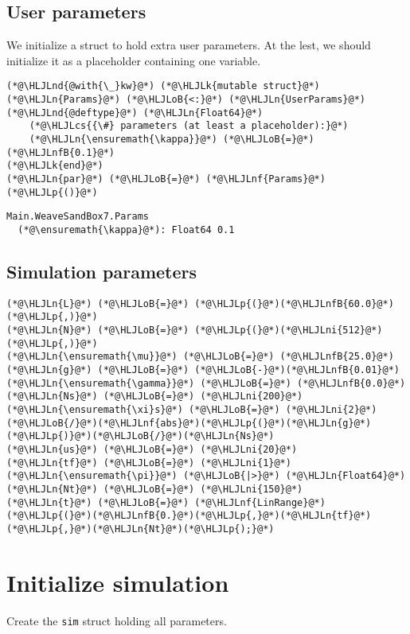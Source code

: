 \documentclass[12pt,a4paper]{article}
\newcommand{\HLJLk}[1]{\textcolor[RGB]{148,91,176}{\textbf{#1}}}
\newcommand{\HLJLn}[1]{#1}
\newcommand{\HLJLnd}[1]{\textcolor[RGB]{214,102,97}{#1}}
\newcommand{\HLJLnf}[1]{\textcolor[RGB]{66,102,213}{#1}}
\newcommand{\HLJLnfB}[1]{\textcolor[RGB]{59,151,46}{#1}}
\newcommand{\HLJLni}[1]{\textcolor[RGB]{59,151,46}{#1}}
\newcommand{\HLJLoB}[1]{\textcolor[RGB]{102,102,102}{\textbf{#1}}}
\newcommand{\HLJLp}[1]{#1}
\newcommand{\HLJLcs}[1]{\textcolor[RGB]{153,153,119}{\textit{#1}}}
\begin{document}
\subsection{User parameters}
We initialize a struct to hold extra user parameters. At the lest, we should initialize it as a placeholder containing one variable.


\begin{lstlisting}
(*@\HLJLnd{@with{\_}kw}@*) (*@\HLJLk{mutable struct}@*) (*@\HLJLn{Params}@*) (*@\HLJLoB{<:}@*) (*@\HLJLn{UserParams}@*) (*@\HLJLnd{@deftype}@*) (*@\HLJLn{Float64}@*)
    (*@\HLJLcs{{\#} parameters (at least a placeholder):}@*)
    (*@\HLJLn{\ensuremath{\kappa}}@*) (*@\HLJLoB{=}@*) (*@\HLJLnfB{0.1}@*)
(*@\HLJLk{end}@*)
(*@\HLJLn{par}@*) (*@\HLJLoB{=}@*) (*@\HLJLnf{Params}@*)(*@\HLJLp{()}@*)
\end{lstlisting}

\begin{lstlisting}
Main.WeaveSandBox7.Params
  (*@\ensuremath{\kappa}@*): Float64 0.1
\end{lstlisting}


\subsection{Simulation parameters}

\begin{lstlisting}
(*@\HLJLn{L}@*) (*@\HLJLoB{=}@*) (*@\HLJLp{(}@*)(*@\HLJLnfB{60.0}@*)(*@\HLJLp{,)}@*)
(*@\HLJLn{N}@*) (*@\HLJLoB{=}@*) (*@\HLJLp{(}@*)(*@\HLJLni{512}@*)(*@\HLJLp{,)}@*)
(*@\HLJLn{\ensuremath{\mu}}@*) (*@\HLJLoB{=}@*) (*@\HLJLnfB{25.0}@*)
(*@\HLJLn{g}@*) (*@\HLJLoB{=}@*) (*@\HLJLoB{-}@*)(*@\HLJLnfB{0.01}@*)
(*@\HLJLn{\ensuremath{\gamma}}@*) (*@\HLJLoB{=}@*) (*@\HLJLnfB{0.0}@*)
(*@\HLJLn{Ns}@*) (*@\HLJLoB{=}@*) (*@\HLJLni{200}@*)
(*@\HLJLn{\ensuremath{\xi}s}@*) (*@\HLJLoB{=}@*) (*@\HLJLni{2}@*)(*@\HLJLoB{/}@*)(*@\HLJLnf{abs}@*)(*@\HLJLp{(}@*)(*@\HLJLn{g}@*)(*@\HLJLp{)}@*)(*@\HLJLoB{/}@*)(*@\HLJLn{Ns}@*)
(*@\HLJLn{us}@*) (*@\HLJLoB{=}@*) (*@\HLJLni{20}@*)
(*@\HLJLn{tf}@*) (*@\HLJLoB{=}@*) (*@\HLJLni{1}@*)(*@\HLJLn{\ensuremath{\pi}}@*) (*@\HLJLoB{|>}@*) (*@\HLJLn{Float64}@*)
(*@\HLJLn{Nt}@*) (*@\HLJLoB{=}@*) (*@\HLJLni{150}@*)
(*@\HLJLn{t}@*) (*@\HLJLoB{=}@*) (*@\HLJLnf{LinRange}@*)(*@\HLJLp{(}@*)(*@\HLJLnfB{0.}@*)(*@\HLJLp{,}@*)(*@\HLJLn{tf}@*)(*@\HLJLp{,}@*)(*@\HLJLn{Nt}@*)(*@\HLJLp{);}@*)
\end{lstlisting}


\section{Initialize simulation}
Create the \texttt{sim} struct holding all parameters.
\end{document}
